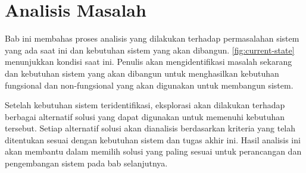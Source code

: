 \chapter{Analisis Masalah}
\label{chap:analisis-masalah}
Bab ini membahas proses analisis yang dilakukan terhadap permasalahan sistem yang ada saat ini dan kebutuhan sistem yang akan dibangun. \autoref{fig:current-state} menunjukkan kondisi saat ini. Penulis akan mengidentifikasi masalah sekarang dan kebutuhan sistem yang akan dibangun untuk menghasilkan kebutuhan fungsional dan non-fungsional yang akan digunakan untuk membangun sistem. 

Setelah kebutuhan sistem teridentifikasi, eksplorasi akan dilakukan terhadap berbagai alternatif solusi yang dapat digunakan untuk memenuhi kebutuhan tersebut. Setiap alternatif solusi akan dianalisis berdasarkan kriteria yang telah ditentukan sesuai dengan kebutuhan sistem dan tugas akhir ini. Hasil analisis ini akan membantu dalam memilih solusi yang paling sesuai untuk perancangan dan pengembangan sistem pada bab selanjutnya.





